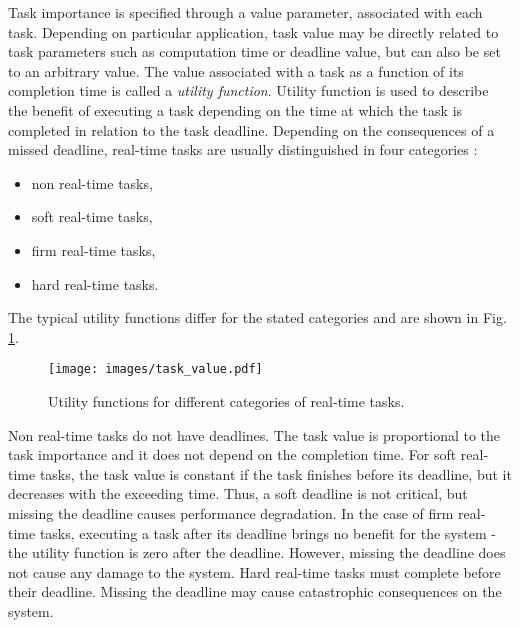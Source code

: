 Task importance is specified through a value parameter, associated with each task.
Depending on particular application, task value may be directly related to task parameters such as computation time or deadline value, but can also be set to an arbitrary value. 
The value associated with a task as a function of its completion time is called a \textit{utility function}.
Utility function is used to describe the benefit of executing a task depending on the time at which the task is completed in relation to the task deadline.
Depending on the consequences of a missed deadline, real-time tasks are usually distinguished in four categories \cite{buttazzo2011hard}:
\begin{itemize}
    \item non real-time tasks,
    \item soft real-time tasks,
    \item firm real-time tasks,
    \item hard real-time tasks.
\end{itemize}
The typical utility functions differ for the stated categories and are shown in Fig. \ref{utility}.
\begin{figure}[ht]
    \centering
    \texttt{[image: images/task\_value.pdf]}
    \caption{Utility functions for different categories of real-time tasks.}
    \label{utility}
\end{figure}
Non real-time tasks do not have deadlines. The task value is proportional to the task importance and it does not depend on the completion time.
For soft real-time tasks, the task value is constant if the task finishes before its deadline, but it decreases with the exceeding time. 
Thus, a soft deadline is not critical, but missing the deadline causes performance degradation.
In the case of firm real-time tasks, executing a task after its deadline brings no benefit for the system - the utility function is zero after the deadline. However, missing the deadline does not cause any damage to the system.
Hard real-time tasks must complete before their deadline. Missing the deadline may cause catastrophic consequences on the system.

